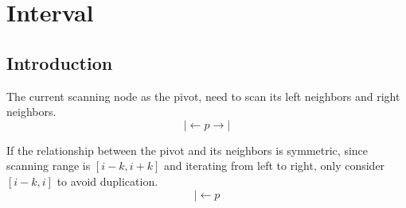 \chapter{Interval}


\section{Introduction}
 The current scanning node as the pivot, need to scan its left neighbors and right neighbors. 
$$
|\leftarrow p \rightarrow |
$$

If the relationship between the pivot and its neighbors is symmetric, since scanning range is $[i-k, i+k]$ and iterating from left to right, only consider $[i-k, i]$ to avoid duplication.
$$
|\leftarrow p
$$


